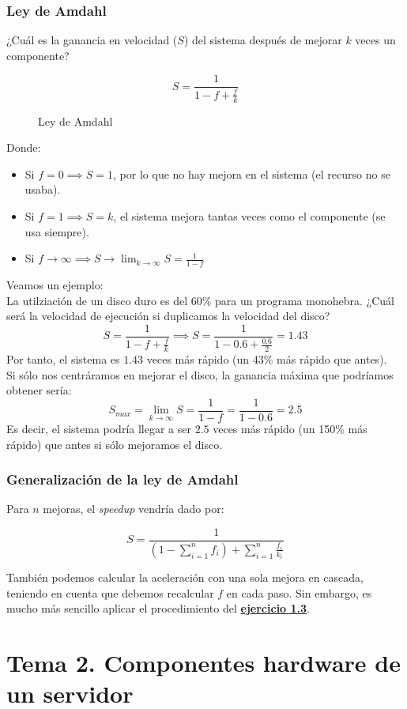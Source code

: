\documentclass[12pt,spanish]{article}
\begin{document}
\subsubsection{Ley de Amdahl}
¿Cuál es la ganancia en velocidad ($S$) del sistema después de mejorar $k$ veces un componente?
\begin{figure}[H]
	\begin{equation}
		S=\frac{1}{1-f+\frac{f}{k}}
	\end{equation}
	\caption{Ley de Amdahl}
\end{figure}
Donde:
\begin{itemize}
	\item Si $f=0 \implies S=1$, por lo que no hay mejora en el sistema (el recurso no se usaba).
	\item Si $f=1 \implies S=k$, el sistema mejora tantas veces como el componente (se usa siempre).
	\item Si $f\to \infty \implies S \to \lim_{k \to \infty} S=\frac{1}{1-f}$
\end{itemize}

Veamos un ejemplo:\\
La utilziación de un disco duro es del 60\% para un programa monohebra. ¿Cuál será la velocidad de ejecución si duplicamos la velocidad del disco?
\[
S=\frac{1}{1-f+\frac{f}{k}} \implies S=\frac{1}{1-0.6+\frac{0.6}{2}}=1.43
\]
Por tanto, el sistema es $1.43$ veces más rápido (un 43\% más rápido que antes).\\
Si sólo nos centráramos en mejorar el disco, la ganancia máxima que podríamos obtener sería:
\[
S_{max}=\lim_{k \to \infty}S=\frac{1}{1-f}=\frac{1}{1-0.6}=2.5
\]
Es decir, el sistema podría llegar a ser $2.5$ veces más rápido (un 150\% más rápido) que antes si sólo mejoramos el disco.

\subsubsection{Generalización de la ley de Amdahl}

Para $n$ mejoras, el \textit{speedup} vendría dado por:

\[
S=\frac{1}{(1-\sum_{i=1}^{n}f_i) + \sum_{i=1}^{n}\frac{f_i}{k_i}}
\]

También podemos calcular la aceleración con una sola mejora en cascada, teniendo en cuenta que debemos recalcular $f$ en cada paso. Sin embargo, es mucho más sencillo aplicar el procedimiento del \hyperref[1.13]{\textbf{ejercicio 1.3}}.
\newpage
\section{Tema 2. Componentes hardware de un servidor}
\end{document}
